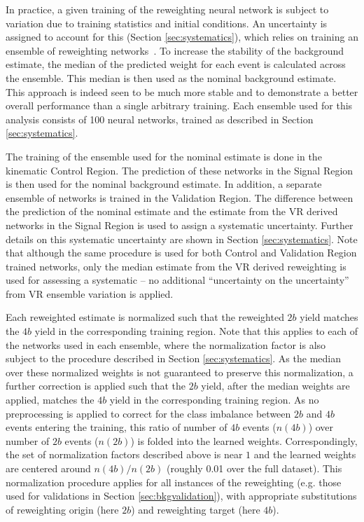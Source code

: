 In practice, a given training of the reweighting neural network is subject to variation
due to training statistics and initial conditions. An uncertainty is assigned to account
for this (Section \ref{sec:systematics}), which relies on training an ensemble of
reweighting networks~\cite{DeepEnsembles}. To increase the stability of the background estimate,
the median of the predicted weight for each event is calculated across the ensemble.
This median is then used as the nominal background estimate. This approach is indeed 
seen to be much more stable and to demonstrate a better overall performance than a 
single arbitrary training. Each ensemble used for this analysis consists of 100 
neural networks, trained as described in Section \ref{sec:systematics}.

The training of the ensemble used for the nominal estimate is done in the kinematic
Control Region. The prediction of these networks in the Signal Region is then used
for the nominal background estimate. In addition, a separate ensemble of networks is 
trained in the Validation Region. The difference between the prediction of the nominal 
estimate and the estimate from the VR derived networks in the Signal Region is used to 
assign a systematic uncertainty. Further details on this systematic uncertainty are shown 
in Section \ref{sec:systematics}.
Note that although the same procedure is used for both Control and Validation Region trained 
networks, only the median estimate from the VR derived reweighting is used for assessing a 
systematic -- no additional ``uncertainty on the uncertainty'' from 
VR ensemble variation is applied.

Each reweighted estimate is normalized such that the reweighted $2b$ yield matches the $4b$ 
yield in the corresponding training region. Note that this applies to each of the networks 
used in each ensemble, where the normalization factor is also subject to the procedure described 
in Section \ref{sec:systematics}. As the median over these normalized weights is not guaranteed 
to preserve this normalization, a further correction is applied such that the $2b$ yield, after 
the median weights are applied, matches the $4b$ yield in the corresponding training region. As no 
preprocessing is applied to correct for the class imbalance between $2b$ and $4b$ events entering 
the training, this ratio of number of $4b$ events ($n(4b)$) over number of $2b$ events ($n(2b)$) is 
folded into the learned weights. Correspondingly, the set of normalization factors described above is 
near $1$ and the learned weights are centered around $n(4b) / n(2b)$ (roughly 0.01 over the full dataset). 
This normalization procedure applies for all instances of the reweighting (e.g. those used for validations 
in Section \ref{sec:bkgvalidation}), with appropriate substitutions of reweighting origin 
(here $2b$) and reweighting target (here $4b$).

